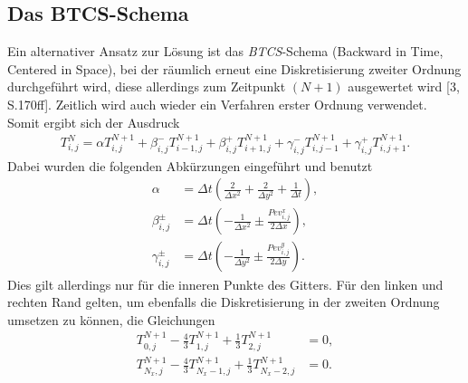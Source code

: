 \documentclass[12pt,a4paper,titlepage,headinclude,bibtotoc]{scrartcl}
\begin{document}
\subsection{Das BTCS-Schema}
\label{sec:btcs}
Ein alternativer Ansatz zur Lösung ist das \textit{BTCS}-Schema (Backward in Time, Centered in Space), bei der räumlich erneut eine Diskretisierung zweiter Ordnung durchgeführt wird, diese allerdings zum Zeitpunkt $(N+1)$ ausgewertet wird [3, S.170ff]. Zeitlich wird auch wieder ein Verfahren erster Ordnung verwendet.
Somit ergibt sich der Ausdruck
\begin{align}
\label{eq:impli}
T_{i,j}^{N} = \alpha T_{i,j}^{N+1} + \beta^-_{i,j} T_{i-1,j}^{N+1} + \beta^+_{i,j} T_{i+1,j}^{N+1} + \gamma^-_{i,j} T_{i,j-1}^{N+1} + \gamma^+_{i,j} T_{i,j+1}^{N+1}.
\end{align}
Dabei wurden die folgenden Abkürzungen eingeführt und benutzt
\begin{align*}
\alpha &= \Delta t \left(\frac{2}{\Delta x^2} + \frac{2}{\Delta y^2} + \frac{1}{\Delta t} \right), \\
\beta^\pm_{i,j} &= \Delta t \left(-\frac{1}{\Delta x^2} \pm \frac{Pe v^x_{i,j}}{2 \Delta x}\right), \\
\gamma^\pm_{i,j} &= \Delta t \left(-\frac{1}{\Delta y^2} \pm \frac{Pe v^y_{i,j}}{2 \Delta y}\right).
\end{align*}
Dies gilt allerdings nur für die inneren Punkte des Gitters. Für den linken und rechten Rand gelten, um ebenfalls die Diskretisierung in der zweiten Ordnung umsetzen zu können, die Gleichungen
\begin{align}
\label{eq:impli_neumann_l}
T^{N+1}_{0,j} - \frac{4}{3} T^{N+1}_{1,j} + \frac{1}{3} T^{N+1}_{2,j} &= 0, \\
\label{eq:impli_neumann_r}
T^{N+1}_{N_x,j} - \frac{4}{3} T^{N+1}_{N_x-1,j} + \frac{1}{3} T^{N+1}_{N_x-2,j} &= 0.
\end{align}
\end{document}
